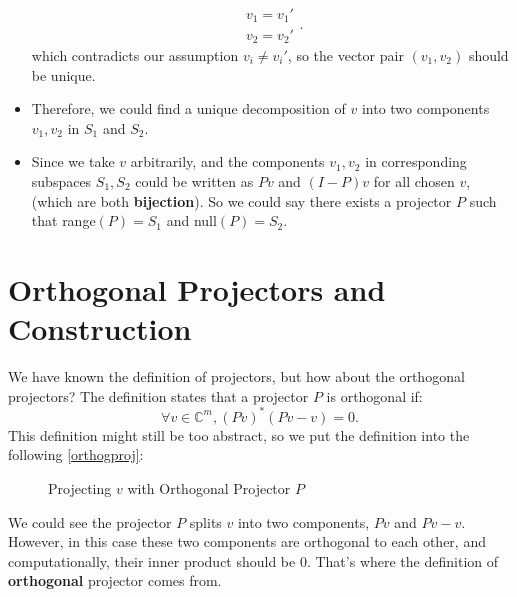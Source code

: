 \begin{itemize}
\[      \begin{array}{l}
      v_1 = v_1' \\
      v_2 = v_2'
      \end{array}
    .\]
    which contradicts our assumption $v_i \neq v_i'$, so the vector pair $(v_1, v_2)$ should be unique.
    \item Therefore, we could find a unique decomposition of $v$ into two components $v_1, v_2$ in  $S_1$ and $S_2$. 
    \item Since we take $v$ arbitrarily, and the components  $v_1, v_2$ in corresponding subspaces $S_1, S_2$ could be written as $Pv$ and  $(I - P)v$ for all chosen $v$, (which are both \textbf{bijection}). So we could say there exists a projector  $P$ such that range$(P) = S_1$ and null$(P) = S_2$.
\end{itemize}


\section{Orthogonal Projectors and Construction}%
We have known the definition of projectors, but how about the orthogonal projectors? The definition states that a projector $P$ is orthogonal if:
\[
\forall v \in \mathbb{C}^{m}, (Pv)^{*}(Pv - v) = 0
.\] 
This definition might still be too abstract, so we put the definition into the following \autoref{orthogproj}:
  \begin{figure}[H]
    \centering
    \caption{Projecting $v$ with Orthogonal Projector $P$}
    \label{orthogproj}
  \end{figure}

\noindent We could see the projector $P$ splits $v$ into two components,  $Pv$ and  $Pv - v$. However, in this case these two components are orthogonal to each other, and computationally, their inner product should be 0. That's where the definition of  \textbf{orthogonal} projector comes from. 

